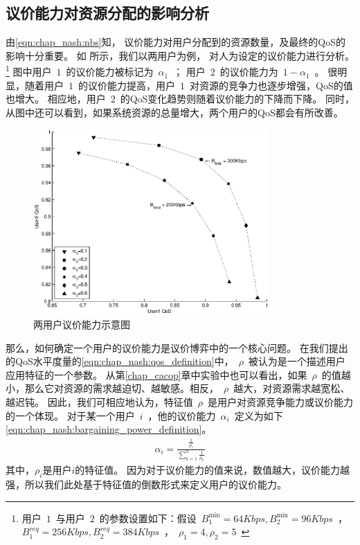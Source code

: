 \subsection{议价能力对资源分配的影响分析}
由\eqref{eqn:chap_nash:nbs}知，
议价能力对用户分配到的资源数量，及最终的QoS的影响十分重要。
如 所示，我们以两用户为例，
对人为设定的议价能力进行分析。
\footnote{用户~$1$~与用户~$2$~的参数设置如下：假设~$B_1^{\min}=64Kbps, B_2^{\min}=96Kbps$~，~$B_1^{req}=256Kbps, B_2^{req}=384Kbps$~，~$\rho_1=4, \rho_2=5$~}
图中用户~$1$~的议价能力被标记为~$\alpha_1$~；
用户~$2$~的议价能力为~$1-\alpha_1$~。
很明显，随着用户~$1$~的议价能力提高，用户~$1$~对资源的竞争力也逐步增强，QoS的值也增大。
相应地，用户~$2$~的QoS变化趋势则随着议价能力的下降而下降。
同时，从图中还可以看到，如果系统资源的总量增大，两个用户的QoS都会有所改善。
\begin{figure}[!tb] 
    \centering 
    \includegraphics[width = 9cm]{chap_nash_two_users_nbs_qos.eps} 
    \caption{两用户议价能力示意图}
    \label{fig:chap_nash:two_users_nbs_qos} 
\end{figure}
那么，如何确定一个用户的议价能力是议价博弈中的一个核心问题。
在我们提出的QoS水平度量的\eqref{eqn:chap_nash:qos_definition}中，~$\rho$~被认为是一个描述用户应用特征的一个参数。
从第\ref{chap_cacop}章中实验中也可以看出，如果~$\rho$~的值越小，那么它对资源的需求越迫切、越敏感。相反，~$\rho$~越大，对资源需求越宽松、越迟钝。
因此，我们可相应地认为，特征值~$\rho$~是用户对资源竞争能力或议价能力的一个体现。
对于某一个用户~$i$~，他的议价能力~$\alpha_i$~定义为如下\eqref{eqn:chap_nash:bargaining_power_definition}。
\begin{align}
    \alpha_i = \frac{\frac{1}{\rho_i}}{\sum_{k=1}^n \frac{1}{\rho_k} }
    \label{eqn:chap_nash:bargaining_power_definition}
\end{align}
其中，$\rho_i$是用户$i$的特征值。
因为对于议价能力的值来说，数值越大，议价能力越强，所以我们此处基于特征值的倒数形式来定义用户的议价能力。


